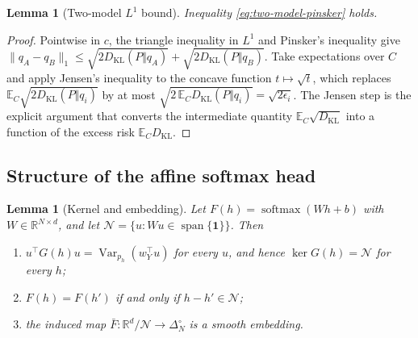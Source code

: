 \documentclass[11pt]{article}
\newtheorem{lemma}[theorem]{Lemma}
\theoremstyle{definition}
\theoremstyle{remark}
\newcommand{\simplex}{\Delta_{N}^{\circ}}
\newcommand{\R}{\mathbb{R}}
\newcommand{\E}{\mathbb{E}}
\newcommand{\KL}{D_{\mathrm{KL}}}
\newcommand{\Var}{\operatorname{Var}}
\begin{document}
\begin{lemma}[Two-model $L^1$ bound]\label{lem:two-model-l1}
Inequality \eqref{eq:two-model-pinsker} holds.
\end{lemma}

\begin{proof}
Pointwise in $c$, the triangle inequality in $L^1$ and Pinsker's inequality
give $\|q_A-q_B\|_1\le\sqrt{2\KL(P\Vert q_A)}+\sqrt{2\KL(P\Vert q_B)}$. Take
expectations over $C$ and apply Jensen's inequality to the concave function
$t\mapsto\sqrt t$, which replaces $\E_C\sqrt{2\KL(P\Vert q_i)}$ by at most
$\sqrt{2\,\E_C\KL(P\Vert q_i)}=\sqrt{2\epsilon_i}$. The Jensen step is the
explicit argument that converts the intermediate quantity
$\E_C\sqrt{\KL}$ into a function of the excess risk $\E_C\KL$.
\end{proof}

\subsection{Structure of the affine softmax head}

\begin{lemma}[Kernel and embedding]\label{lem:affine-head-structure}
Let $F(h)=\operatorname{softmax}(Wh+b)$ with $W\in\R^{N\times d}$, and let
$\mathcal N=\{u:Wu\in\operatorname{span}\{\bm 1\}\}$. Then
\begin{enumerate}[leftmargin=*,itemsep=0.2em]
    \item $u^\top G(h)u=\Var_{p_h}(w_Y^\top u)$ for every $u$, and hence
      $\ker G(h)=\mathcal N$ for every $h$;
    \item $F(h)=F(h')$ if and only if $h-h'\in\mathcal N$;
    \item the induced map $\bar F:\R^d/\mathcal N\to\simplex$ is a smooth
      embedding.
\end{enumerate}
\end{lemma}
\end{document}
